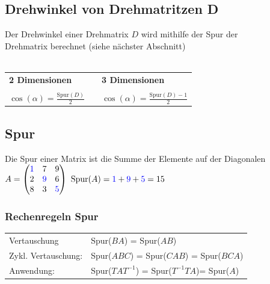 		  	
			\subsection{Drehwinkel von Drehmatritzen D}		  	
			Der Drehwinkel einer Drehmatrix $D$ wird mithilfe der Spur der \\
			Drehmatrix berechnet (siehe nächster Abschnitt) \\ 	
			\\	  			
			\begin{tabular}{lll}
			\textbf{2 Dimensionen} & & \textbf{3 Dimensionen} \\
			\\
			$\cos(\alpha) = \frac{\mathrm{Spur}(D)}{2}$ & & $\cos(\alpha) = \frac{\mathrm{Spur}(D) -1}{2}$
			\end{tabular}
		  	
			\vfill\null
			\columnbreak		  	
		  	
		  	
			\subsection{Spur}		  	
			Die Spur einer Matrix ist die Summe der Elemente auf der Diagonalen \\
			
			$A =  \begin{pmatrix}	\textcolor{blue}{1} & 7 & 9 \\ 2 & \textcolor{blue}{9} & 6 \\ 8 & 3 & \textcolor{blue}{5}	\end{pmatrix}$	   \qquad 	$\mathrm{Spur}(A) = \textcolor{blue}{1} + \textcolor{blue}{9} + \textcolor{blue}{5} = 15$ 
		  	
		  	\subsubsection{Rechenregeln Spur}
		  	\begin{tabular}{ll}
		  	Vertauschung & Spur($BA$) = Spur($AB$) \\
		  	Zykl. Vertauschung: & Spur($ABC$) = Spur($CAB$) = Spur($BCA$)\\
		  	Anwendung: & Spur($TAT^{-1}$) = Spur($T^{-1}TA$)= Spur($A$)\\
		  	\end{tabular}
		  	
